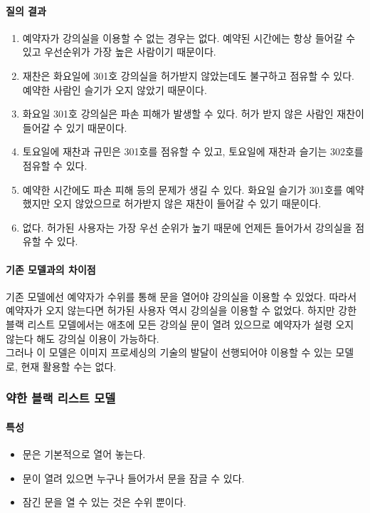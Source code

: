 \documentclass[11pt,a4paper]{article}
\begin{document}
\paragraph{질의 결과}
\begin{enumerate}
\item 예약자가 강의실을 이용할 수 없는 경우는 없다. 예약된 시간에는 항상 들어갈 수 있고 우선순위가 가장 높은 사람이기 때문이다.
\item 재찬은 화요일에 301호 강의실을 허가받지 않았는데도 불구하고 점유할 수 있다. 예약한 사람인 슬기가 오지 않았기 때문이다.
\item 화요일 301호 강의실은 파손 피해가 발생할 수 있다. 허가 받지 않은 사람인 재찬이 들어갈 수 있기 때문이다.
\item 토요일에 재찬과 규민은 301호를 점유할 수 있고, 토요일에 재찬과 슬기는 302호를 점유할 수 있다.
\item 예약한 시간에도 파손 피해 등의 문제가 생길 수 있다. 화요일 슬기가 301호를 예약했지만 오지 않았으므로 허가받지 않은 재찬이 들어갈 수 있기 때문이다.
\item 없다. 허가된 사용자는 가장 우선 순위가 높기 때문에 언제든 들어가서 강의실을 점유할 수 있다.
\end{enumerate}

\paragraph{기존 모델과의 차이점}
\hfill\break
기존 모델에선 예약자가 수위를 통해 문을 열어야 강의실을 이용할 수 있었다. 따라서 예약자가 오지 않는다면 허가된 사용자 역시 강의실을 이용할 수 없었다. 하지만 강한 블랙 리스트 모델에서는 애초에 모든 강의실 문이 열려 있으므로 예약자가 설령 오지 않는다 해도 강의실 이용이 가능하다.\\
그러나 이 모델은 이미지 프로세싱의 기술의 발달이 선행되어야 이용할 수 있는 모델로, 현재 활용할 수는 없다.

\subsubsection{약한 블랙 리스트 모델}

\paragraph{특성}
\begin{itemize}
\item 문은 기본적으로 열어 놓는다.
\item 문이 열려 있으면 누구나 들어가서 문을 잠글 수 있다.
\item 잠긴 문을 열 수 있는 것은 수위 뿐이다.
\end{itemize}
\end{document}
